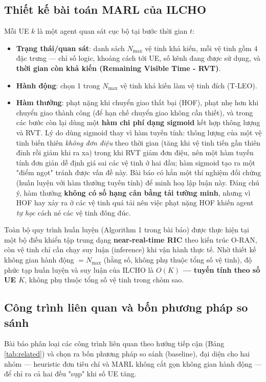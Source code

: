 \documentclass{article} %
\begin{document}
\subsection{Thiết kế bài toán MARL của ILCHO}
Mỗi UE $k$ là một agent quan sát cục bộ tại bước thời gian $t$:
\begin{itemize}
    \item \textbf{Trạng thái/quan sát}: danh sách $N_{\max}$ vệ tinh khả kiến, mỗi vệ tinh gồm 4 đặc trưng — chỉ số logic, khoảng cách tới UE, số kênh đang được sử dụng, và \textbf{thời gian còn khả kiến (Remaining Visible Time - RVT)}.
    \item \textbf{Hành động}: chọn 1 trong $N_{\max}$ vệ tinh khả kiến làm vệ tinh đích (T-LEO).
    \item \textbf{Hàm thưởng}: phạt nặng khi chuyển giao thất bại (HOF), phạt nhẹ hơn khi chuyển giao thành công (để hạn chế chuyển giao không cần thiết), và trong các bước còn lại dùng một \textbf{hàm chi phí dạng sigmoid} kết hợp thông lượng và RVT. Lý do dùng sigmoid thay vì hàm tuyến tính: thông lượng của một vệ tinh biến thiên \emph{không đơn điệu} theo thời gian (tăng khi vệ tinh tiến gần thiên đỉnh rồi giảm khi ra xa) trong khi RVT giảm đơn điệu, nên một hàm tuyến tính đơn giản dễ định giá sai các vệ tinh ở hai đầu; hàm sigmoid tạo ra một "điểm ngọt" tránh được vấn đề này. Bài báo có hẳn một thí nghiệm đối chứng (huấn luyện với hàm thưởng tuyến tính) để minh hoạ lập luận này. Đáng chú ý, hàm thưởng \textbf{không có số hạng cân bằng tải tường minh}, nhưng vì HOF hay xảy ra ở các vệ tinh quá tải nên việc phạt nặng HOF khiến agent \emph{tự học} cách né các vệ tinh đông đúc.
\end{itemize}
Toàn bộ quy trình huấn luyện (Algorithm 1 trong bài báo) được thực hiện tại một bộ điều khiển tập trung dạng \textbf{near-real-time RIC} theo kiến trúc O-RAN, còn vệ tinh chỉ cần chạy suy luận (inference) khi vận hành thực tế. Nhờ thiết kế không gian hành động $=N_{\max}$ (hằng số, không phụ thuộc tổng số vệ tinh), độ phức tạp huấn luyện và suy luận của ILCHO là \textbf{$O(K)$ — tuyến tính theo số UE $K$}, không phụ thuộc tổng số vệ tinh trong chòm sao.

\subsection{Công trình liên quan và bốn phương pháp so sánh}
Bài báo phân loại các công trình liên quan theo hướng tiếp cận (Bảng \ref{tab:related}) và chọn ra bốn phương pháp so sánh (baseline), đại diện cho hai nhóm — heuristic đơn tiêu chí và MARL không cắt gọn không gian hành động — để chỉ ra cả hai đều "sụp" khi số UE tăng.
\end{document}
